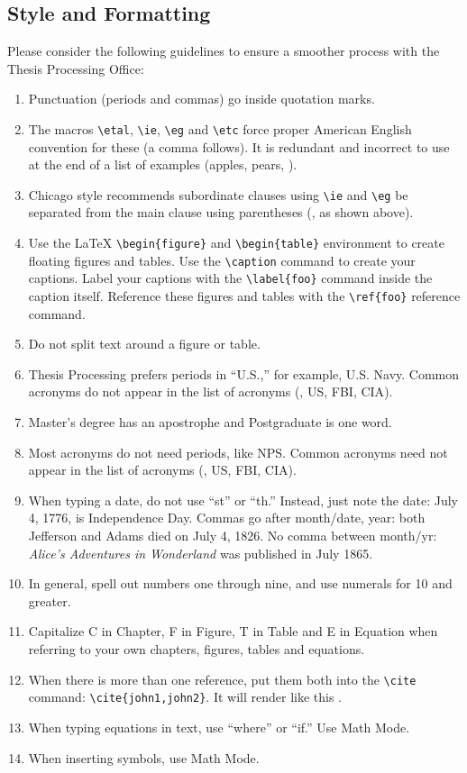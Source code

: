 \subsection{Style and Formatting}
Please consider the following guidelines to ensure a smoother process with the Thesis Processing Office:
\begin{enumerate}
    \item Punctuation (periods and commas) go inside quotation marks. 
    \item The macros \verb+\etal+, \verb+\ie+, \verb+\eg+ and \verb+\etc+ force proper
      American English convention for these (\ie a comma follows).
      It is redundant and incorrect to use \etc at the end of a list of
      examples (\eg apples, pears, \etc).
    \item Chicago style recommends subordinate clauses using \verb+\ie+ and \verb+\eg+ be
    separated from the main clause using parentheses (\eg, as shown above).
    \item Use the \LaTeX{} \verb+\begin{figure}+ and \verb+\begin{table}+ environment to
      create floating figures and tables. Use the \verb+\caption+ command
      to create your captions. Label your captions with the
      \verb+\label{foo}+ command inside the caption itself. Reference
      these figures and tables with the \verb+\ref{foo}+ reference command.
    \item Do not split text around a figure or table. 
    \item Thesis Processing prefers periods in ``U.S.,'' for example, U.S. Navy.
    Common acronyms do not appear in the list of acronyms (\eg, \ac{US}, \ac{FBI}, \ac{CIA}).
    \item Master's degree has an apostrophe and Postgraduate is one word. 
    \item Most acronyms do not need periods, like \ac{NPS}. Common acronyms need not appear in the list of acronyms (\eg, \ac{US}, \ac{FBI}, \ac{CIA}).
    \item When typing a date, do not use ``st'' or ``th.'' Instead, just
      note the date: July 4, 1776, is Independence Day. Commas go 
    after month/date, year: both Jefferson and Adams died on July 4, 1826.
    No comma between month/yr: \textit{Alice's Adventures in Wonderland} was published in July 1865.
    \item In general, spell out numbers one through nine, and use numerals for 10 and greater.
    \item Capitalize C in Chapter, F in Figure, T in Table and E in Equation when referring
    to your own chapters, figures, tables and equations.
    \item When there is more than one reference, put them both into the \verb+\cite+ command: \verb+\cite{john1,john2}+. It will render like this \citep{sanico_2018,Griffin:2009,linguine_2016}.
    \item When typing equations in text, use ``where'' or ``if.'' Use Math Mode. 
    \item When inserting symbols, use Math Mode.
\end{enumerate}
